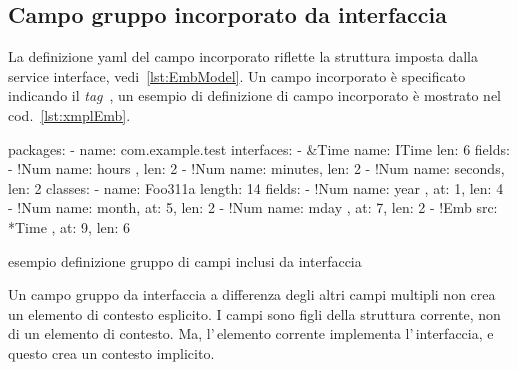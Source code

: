 \documentclass[a4paper,10pt]{report}
\newif\ifesource
\newenvironment{elisting}[1][H]
  {\captionsetup{aboveskip=0pt}\begin{listing}[#1]}
  {\end{listing}%
}
\begin{document}
\subsection{Campo gruppo incorporato da interfaccia} \label{sub:yaml.emb}
La definizione yaml del campo incorporato riflette la struttura imposta dalla
service interface, vedi~\ref{lst:EmbModel}.
Un campo incorporato è specificato indicando il \textsl{tag} 
\,, 
un esempio di definizione di campo incorporato è mostrato nel 
cod.~\ref{lst:xmplEmb}.

\ifesource
\begin{figure*}[!htb]
\begin{lstlisting}[language=yaml, 
caption={esempio definizione di campi inclusi da interfaccia}, 
label=lst:xmplEmp]
packages:
  - name: com.example.test
    interfaces:
      - &Time
        name: ITime
        len: 6
        fields:
          - !Num { name: hours  , len: 2 }
          - !Num { name: minutes, len: 2 }
          - !Num { name: seconds, len: 2 }
    classes:
      - name: Foo311a
        length: 14
        fields:
          - !Num { name: year , at: 1, len: 4 }
          - !Num { name: month, at: 5, len: 2 }
          - !Num { name: mday , at: 7, len: 2 }
          - !Emb { src: *Time , at: 9, len: 6 }
\end{lstlisting}
\end{figure*}
\else
\begin{elisting}[!htb]
\begin{yamlcode}
packages:
  - name: com.example.test
    interfaces:
      - &Time
        name: ITime
        len: 6
        fields:
          - !Num { name: hours  , len: 2 }
          - !Num { name: minutes, len: 2 }
          - !Num { name: seconds, len: 2 }
    classes:
      - name: Foo311a
        length: 14
        fields:
          - !Num { name: year , at: 1, len: 4 }
          - !Num { name: month, at: 5, len: 2 }
          - !Num { name: mday , at: 7, len: 2 }
          - !Emb { src: *Time , at: 9, len: 6 }
\end{yamlcode}
\caption{esempio definizione gruppo di campi inclusi da interfaccia}
\label{lst:xmplEmb}
\end{elisting}
\fi

Un campo gruppo da interfaccia a differenza degli altri campi multipli non 
crea un elemento di contesto esplicito. I campi sono figli della struttura 
corrente, non di un elemento di contesto. Ma, l'\,elemento corrente
implementa l'\,interfaccia, e questo crea un contesto implicito.
\end{document}
